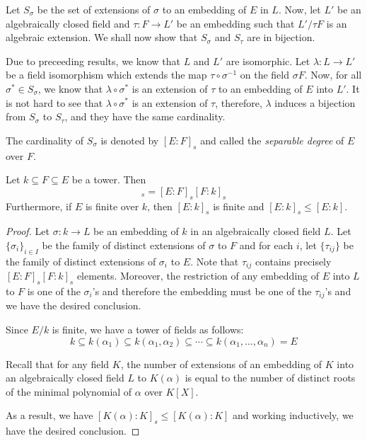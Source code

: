 Let $S_\sigma$ be the set of extensions of $\sigma$ to an embedding of $E$ in $L$. Now, let $L'$ be an algebraically closed field and $\tau: F\to L'$ be an embedding such that $L'/\tau F$ is an algebraic extension. We shall now show that $S_\sigma$ and $S_\tau$ are in bijection.

Due to preceeding results, we know that $L$ and $L'$ are isomorphic. Let $\lambda: L\to L'$ be a field isomorphism which extends the map $\tau\circ\sigma^{-1}$ on the field $\sigma F$. Now, for all $\sigma^*\in S_\sigma$, we know that $\lambda\circ\sigma^*$ is an extension of $\tau$ to an embedding of $E$ into $L'$. It is not hard to see that $\lambda\circ\sigma^*$ is an extension of $\tau$, therefore, $\lambda$ induces a bijection from $S_\sigma$ to $S_\tau$, and they have the same cardinality.

\begin{definition}
    The cardinality of $S_\sigma$ is denoted by $[E:F]_s$ and called the \textit{separable degree} of $E$ over $F$.
\end{definition}


\begin{theorem}
    Let $k\subseteq F\subseteq E$ be a tower. Then 
    \begin{equation*}
        [E:k]_s = [E:F]_s[F:k]_s
    \end{equation*}
    Furthermore, if $E$ is finite over $k$, then $[E:k]_s$ is finite and $[E:k]_s\le[E:k]$. 
\end{theorem}
\begin{proof}
    Let $\sigma: k\to L$ be an embedding of $k$ in an algebraically closed field $L$. Let $\{\sigma_i\}_{i\in I}$ be the family of distinct extensions of $\sigma$ to $F$ and for each $i$, let $\{\tau_{ij}\}$ be the family of distinct extensions of $\sigma_i$ to $E$. Note that $\tau_{ij}$ contains precisely $[E:F]_s[F:k]_s$ elements. Moreover, the restriction of any embedding of $E$ into $L$ to $F$ is one of the $\sigma_i$'s and therefore the embedding must be one of the $\tau_{ij}$'s and we have the desired conclusion.

    Since $E/k$ is finite, we have a tower of fields as follows: 
    \begin{equation*}
        k\subseteq k(\alpha_1)\subseteq k(\alpha_1,\alpha_2)\subseteq\cdots\subseteq k(\alpha_1,\ldots,\alpha_n) = E
    \end{equation*}

    Recall that for any field $K$, the number of extensions of an embedding of $K$ into an algebraically closed field $L$ to $K(\alpha)$ is equal to the number of distinct roots of the minimal polynomial of $\alpha$ over $K[X]$.

    As a result, we have $[K(\alpha):K]_s\le [K(\alpha):K]$ and working inductively, we have the desired conclusion.
\end{proof}

